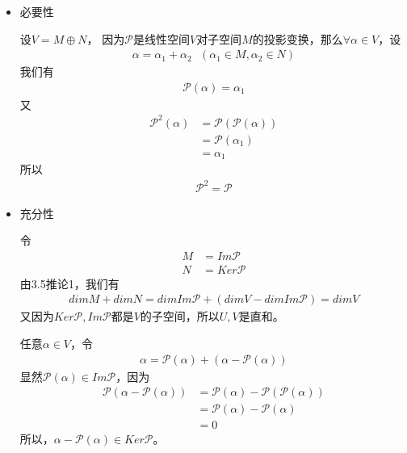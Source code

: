 \documentclass{article}
\begin{document}
\begin{itemize}
  \item 必要性

        设$V = M \oplus N$，
        因为$\mathscr{P}$是线性空间$V$对子空间$M$的投影变换，那么$\forall \alpha \in V$，设
        \begin{align*}
          \alpha = \alpha_1 + \alpha_2 \ \ \ (\alpha_1 \in M, \alpha_2 \in N)
        \end{align*}
        我们有
        \begin{align*}
          \mathscr{P}(\alpha) = \alpha_1
        \end{align*}
        又
        \begin{align*}
          \mathscr{P}^2(\alpha) & = \mathscr{P}(\mathscr{P}(\alpha)) \\
                                & = \mathscr{P}(\alpha_1)            \\
                                & = \alpha_1
        \end{align*}
        所以
        \begin{align*}
          \mathscr{P}^2 = \mathscr{P}
        \end{align*}

  \item 充分性

        令
        \begin{align*}
          M & = Im\mathscr{P}  \\
          N & = Ker\mathscr{P}
        \end{align*}
        由3.5推论1，我们有
        \begin{align*}
          dim M + dim N = dim Im\mathscr{P} + (dim V - dim Im\mathscr{P}) = dim V
        \end{align*}
        又因为$Ker\mathscr{P}, Im\mathscr{P}$都是$V$的子空间，所以$U, V$是直和。

        任意$\alpha \in V$，令
        \begin{align*}
          \alpha = \mathscr{P}(\alpha) + (\alpha - \mathscr{P}(\alpha))
        \end{align*}
        显然$\mathscr{P}(\alpha) \in Im \mathscr{P}$，因为
        \begin{align*}
          \mathscr{P}(\alpha - \mathscr{P}(\alpha))
          & = \mathscr{P}(\alpha) - \mathscr{P}(\mathscr{P}(\alpha)) \\
          & = \mathscr{P}(\alpha) - \mathscr{P}(\alpha) \\
          & = 0 
        \end{align*}
        所以，$\alpha - \mathscr{P}(\alpha) \in Ker\mathscr{P}$。


\end{itemize}
\end{document}

